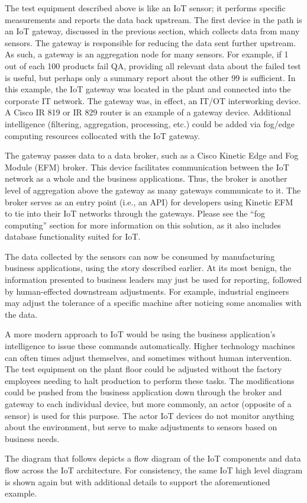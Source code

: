 The test equipment described above is like an IoT sensor; it performs specific
measurements and reports the data back upstream. The first device in the path
is an IoT gateway, discussed in the previous section, which collects data from
many sensors. The gateway is responsible for reducing the data sent further
upstream. As such, a gateway is an aggregation node for many sensors. For
example, if 1 out of each 100 products fail QA, providing all relevant data
about the failed test is useful, but perhaps only a summary report about the
other 99 is sufficient. In this example, the IoT gateway was located in the
plant and connected into the corporate IT network. The gateway was, in effect,
an IT/OT interworking device. A Cisco IR 819 or IR 829 router is an example of
a gateway device. Additional intelligence (filtering, aggregation, processing,
etc.) could be added via fog/edge computing resources collocated with the IoT
gateway.

The gateway passes data to a data broker, such as a Cisco Kinetic Edge and Fog
Module (EFM) broker. This device facilitates communication between the IoT
network as a whole and the business applications. Thus, the broker is another
level of aggregation above the gateway as many gateways communicate to it. The
broker serves as an entry point (i.e., an API) for developers using Kinetic
EFM to tie into their IoT networks through the gateways. Please see the ``fog
computing'' section for more information on this solution, as it also includes
database functionality suited for IoT.

The data collected by the sensors can now be consumed by manufacturing
business applications, using the story described earlier. At its most benign,
the information presented to business leaders may just be used for reporting,
followed by human-effected downstream adjustments. For example, industrial
engineers may adjust the tolerance of a specific machine after noticing some
anomalies with the data.

A more modern approach to IoT would be using the business application's
intelligence to issue these commands automatically. Higher technology machines
can often times adjust themselves, and sometimes without human intervention.
The test equipment on the plant floor could be adjusted without the factory
employees needing to halt production to perform these tasks. The modifications
could be pushed from the business application down through the broker and
gateway to each individual device, but more commonly, an actor (opposite of a
sensor) is used for this purpose. The actor IoT devices do not monitor
anything about the environment, but serve to make adjustments to sensors based
on business needs.

The diagram that follows depicts a flow diagram of the IoT components and data flow
across the IoT architecture. For consistency, the same IoT high level diagram
is shown again but with additional details to support the aforementioned example.

